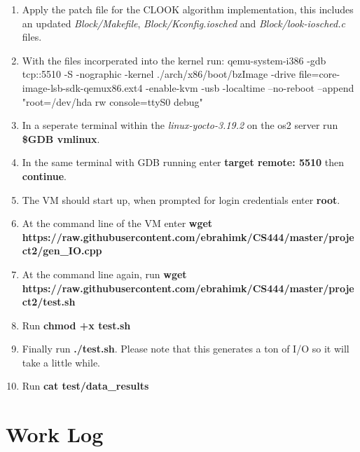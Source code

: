 \documentclass[10pt,onecolumn,draftclsnofoot]{IEEEtran} %
\begin{document}
\begin{singlespace}
	\begin{enumerate}
                \item Apply the patch file for the CLOOK algorithm implementation, this includes an updated \textit{Block/Makefile}, \textit{Block/Kconfig.iosched} and \textit{Block/look-iosched.c} files. 
                \item With the files incorperated into the kernel run: qemu-system-i386 -gdb tcp::5510 -S -nographic -kernel ./arch/x86/boot/bzImage -drive file=core-image-lsb-sdk-qemux86.ext4 -enable-kvm -usb -localtime --no-reboot --append "root=/dev/hda rw console=ttyS0 debug"
                \item In a seperate terminal within the \textit{linux-yocto-3.19.2} on the os2 server run \textbf{\$GDB vmlinux}.
		\item In the same terminal with GDB running enter \textbf{target remote: 5510} then \textbf{continue}.
		\item The VM should start up, when prompted for login credentials enter \textbf{root}.
		\item At the command line of the VM enter \textbf{wget https://raw.githubusercontent.com/ebrahimk/CS444/master/project2/gen\_IO.cpp}
		\item At the command line again, run \textbf{wget https://raw.githubusercontent.com/ebrahimk/CS444/master/project2/test.sh}
		\item Run \textbf{chmod +x test.sh}
		\item Finally run \textbf{./test.sh}. Please note that this generates a ton of I/O so it will take a little while. 
		\item Run \textbf{cat test/data\_results}
        \end{enumerate}
	

\newpage
\section{\bf Work Log}

                

\newpage


\end{singlespace}
\restoregeometry
\end{document}
